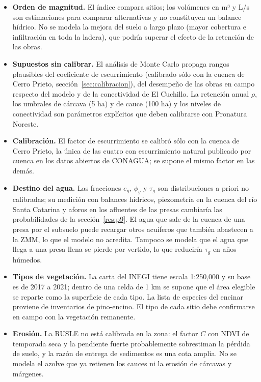\begin{itemize}
  \item \textbf{Orden de magnitud.} El índice compara sitios; los volúmenes en m³ y L/s son estimaciones para comparar alternativas y no constituyen un balance hídrico. No se modela la mejora del suelo a largo plazo (mayor cobertura e infiltración en toda la ladera), que podría superar el efecto de la retención de las obras.
  \item \textbf{Supuestos sin calibrar.} El análisis de Monte Carlo propaga rangos plausibles del coeficiente de escurrimiento (calibrado sólo con la cuenca de Cerro Prieto, sección~\ref{sec:calibracion}), del desempeño de las obras en campo respecto del modelo y de la conectividad de El Cuchillo. La retención anual $\rho$, los umbrales de cárcava (5 ha) y de cauce (100 ha) y los niveles de conectividad son parámetros explícitos que deben calibrarse con Pronatura Noreste.
  \item \textbf{Calibración.} El factor de escurrimiento se calibró sólo con la cuenca de Cerro Prieto, la única de las cuatro con escurrimiento natural publicado por cuenca en los datos abiertos de CONAGUA; se supone el mismo factor en las demás.
  \item \textbf{Destino del agua.} Las fracciones $e_g$, $\phi_g$ y $\tau_g$ son distribuciones a priori no calibradas; su medición con balances hídricos, piezometría en la cuenca del río Santa Catarina y aforos en los afluentes de las presas cambiaría las probabilidades de la sección~\ref{res:p9}. El agua que sale de la cuenca de una presa por el subsuelo puede recargar otros acuíferos que también abastecen a la ZMM, lo que el modelo no acredita. Tampoco se modela que el agua que llega a una presa llena se pierde por vertido, lo que reduciría $\tau_g$ en años húmedos.
  \item \textbf{Tipos de vegetación.} La carta del INEGI tiene escala 1:250,000 y su base es de 2017 a 2021; dentro de una celda de 1 km se supone que el área elegible se reparte como la superficie de cada tipo. La lista de especies del encinar proviene de inventarios de pino-encino. El tipo de cada sitio debe confirmarse en campo con la vegetación remanente.
  \item \textbf{Erosión.} La RUSLE no está calibrada en la zona: el factor $C$ con NDVI de temporada seca y la pendiente fuerte probablemente sobrestiman la pérdida de suelo, y la razón de entrega de sedimentos es una cota amplia. No se modela el azolve que ya retienen los cauces ni la erosión de cárcavas y márgenes.

\end{itemize}
